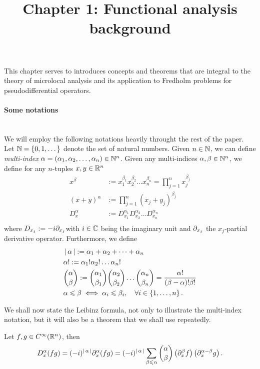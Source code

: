 \documentclass[12pt]{article}
\title{Chapter 1: Functional analysis background}
\date{}
\begin{document}
\maketitle

This chapter serves to introduces concepts and theorems that are integral to the theory of microlocal analysis and its application to Fredholm problems for pseudodifferential operators. 

\paragraph{Some notations} \hfill \\
We will employ the following notations heavily throught the rest of the paper. Let ${\mathbb N} = \left\{0, 1, \dots\right\}$ denote the set of natural numbers. Given $n \in {\ensuremath {\mathbb N}}$, we can define \textit{multi-index} $\alpha = (\alpha_1, \alpha_2, \dots, \alpha_n) \in {\ensuremath {\mathbb N}}^n$. Given any multi-indices $\alpha, \beta \in {\ensuremath {\mathbb N}}^n$, we define for any $n$-tuples $x, y \in {\ensuremath {\mathbb R}}^n$ 
\begin{align*}
x^\beta &:= x_1^{\beta_1} x_2^{\beta_2}\dots x_n^{\beta_n} = \prod_{j = 1}^n x_j^{\beta_j}\\
 (x + y)^\alpha &:= \prod_{j = 1}^n (x_j + y_j)^{\beta_j} \\
D^\alpha_x &:= D_{x_1}^{\alpha_1} D_{x_2}^{\alpha_2} \dots D_{x_n}^{\alpha_n}\\
\end{align*}
where $D_{x_j} := - i \partial_{x_j}$with $i \in {\ensuremath {\mathbb C}}$ being the imaginary unit and $\partial_{x_j} $ the $x_j$-partial derivative operator. Furthermore, we define
\begin{align*}
&\left|\, \alpha\,\right| := \alpha_1 + \alpha_2 + \dots + \alpha_n\\
& \alpha! := \alpha_1! \alpha_2! \dots \alpha_n! \\
& \binom{\alpha}{\beta} := \binom{\alpha_1}{\beta_1} \binom{\alpha_2}{ \beta_2} \dots \binom{\alpha_n}{\beta_n} = \frac{\alpha!}{(\beta - \alpha)! \beta!} \\
&\alpha \leqslant \beta \iff \alpha_i \leqslant \beta_i, \quad \forall i \in \left\{1, \dots, n\right\}. 
\end{align*}

We shall now state the Leibinz formula, not only to illustrate the multi-index notation, but it will also be a theorem that we shall use repeatedly. 
\begin{ftheorem}
    Let $f, g \in C^\infty({\mathbb R}^n)$, then 
    \begin{align*}
    D^\alpha_x (fg) = (-i)^{\left|\, \alpha\,\right|} \partial_x^\alpha(fg) = (-i)^{\left|\, \alpha\,\right|} \sum_{\beta \leqslant \alpha} \binom{\alpha}{\beta}  \left(\partial_x^\beta f\right) \left(\partial_x^{\alpha - \beta}g\right). 
    \end{align*}
\end{ftheorem}
\end{document}
